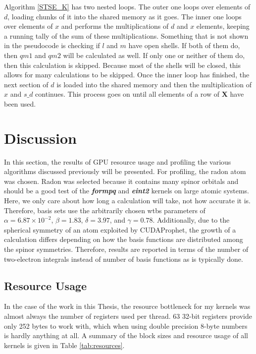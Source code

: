 \documentclass[12pt]{report}
\newcommand{\kernel}[1]{\textit{\textbf{#1}}}
\begin{document}
Algorithm \ref{STSE_K} has two nested loops. The outer one loops over elements of $d$, loading chunks of it into the shared memory as it goes. The inner one loops over elements of $x$ and performs the multiplications of $d$ and $x$ elements, keeping a running tally of the sum of these multiplications. Something that is not shown in the pseudocode is checking if $l$ and $m$ have open shells. If both of them do, then $qm1$ and $qm2$ will be calculated as well. If only one or neither of them do, then this calculation is skipped. Because most of the shells will be closed, this allows for many calculations to be skipped. Once the inner loop has finished, the next section of $d$ is loaded into the shared memory and then the multiplication of $x$ and $s\_d$ continues. This process goes on until all elements of a row of \textbf{X} have been used.

\section{Discussion}
In this section, the results of GPU resource usage and profiling the various algorithms discussed previously will be presented. For profiling, the radon atom was chosen. Radon was selected because it contains many spinor orbitals and should be a good test of the \kernel{formpq} and \kernel{eint2} kernels on large atomic systems. Here, we only care about how long a calculation will take, not how accurate it is. Therefore, basis sets use the arbitrarily chosen wtbs parameters of $\alpha = 6.87\times10^{-2}$, $\beta = 1.83$,  $\delta = 3.97$, and $\gamma = 0.78$. Additionally, due to the spherical symmetry of an atom exploited by CUDAProphet, the growth of a calculation differs depending on how the basis functions are distributed among the spinor symmetries. Therefore, results are reported in terms of the number of two-electron integrals instead of number of basis functions as is typically done.
\subsection{Resource Usage}
In the case of the work in this Thesis, the resource bottleneck for my kernels was almost always the number of registers used per thread. 63 32-bit registers provide only 252 bytes to work with, which when using double precision 8-byte numbers is hardly anything at all. A summary of the block sizes and resource usage of all kernels is given in Table \ref{tab:resources}.
\end{document}
